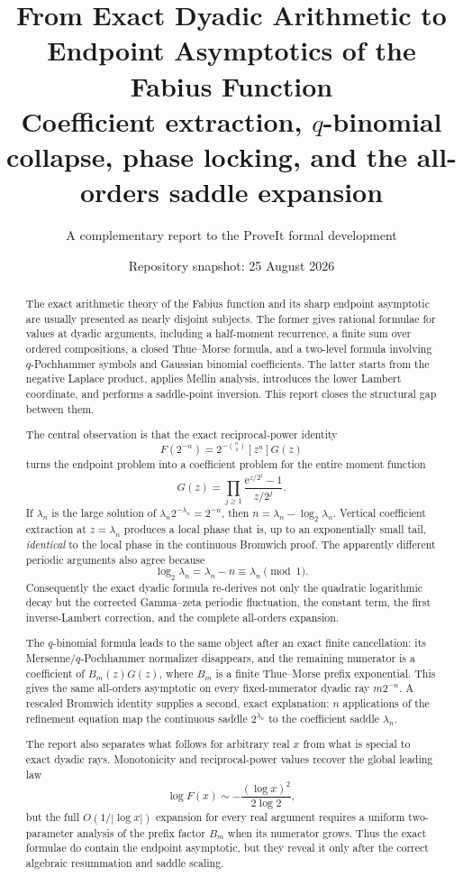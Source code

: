 \documentclass[11pt,oneside]{article}
\title{\bfseries From Exact Dyadic Arithmetic to Endpoint Asymptotics of the Fabius Function\\[0.35em]
\large Coefficient extraction, $q$-binomial collapse, phase locking, and the all-orders saddle expansion}
\author{A complementary report to the ProveIt formal development}
\date{Repository snapshot: 25 August 2026}
\theoremstyle{definition}
\theoremstyle{remark}
\newcommand{\e}{\mathrm e}
\begin{document}
\maketitle

\begin{abstract}
The exact arithmetic theory of the Fabius function and its sharp endpoint asymptotic are usually presented as nearly disjoint subjects.  The former gives rational formulae for values at dyadic arguments, including a half-moment recurrence, a finite sum over ordered compositions, a closed Thue--Morse formula, and a two-level formula involving $q$-Pochhammer symbols and Gaussian binomial coefficients.  The latter starts from the negative Laplace product, applies Mellin analysis, introduces the lower Lambert coordinate, and performs a saddle-point inversion.  This report closes the structural gap between them.

The central observation is that the exact reciprocal-power identity
\[
 F(2^{-n})=2^{-\binom n2}[z^n]G(z)
\]
turns the endpoint problem into a coefficient problem for the entire moment function
\[
 G(z)=\prod_{j\ge1}\frac{\e^{z/2^j}-1}{z/2^j}.
\]
If $\lambda_n$ is the large solution of $\lambda_n2^{-\lambda_n}=2^{-n}$, then
$n=\lambda_n-\log_2\lambda_n$.  Vertical coefficient extraction at $z=\lambda_n$ produces a local phase that is, up to an exponentially small tail, \emph{identical} to the local phase in the continuous Bromwich proof.  The apparently different periodic arguments also agree because
\[
 \log_2\lambda_n=\lambda_n-n\equiv\lambda_n\pmod 1.
\]
Consequently the exact dyadic formula re-derives not only the quadratic logarithmic decay but the corrected Gamma--zeta periodic fluctuation, the constant term, the first inverse-Lambert correction, and the complete all-orders expansion.

The $q$-binomial formula leads to the same object after an exact finite cancellation: its Mersenne/$q$-Pochhammer normalizer disappears, and the remaining numerator is a coefficient of $B_m(z)G(z)$, where $B_m$ is a finite Thue--Morse prefix exponential.  This gives the same all-orders asymptotic on every fixed-numerator dyadic ray $m2^{-n}$.  A rescaled Bromwich identity supplies a second, exact explanation: $n$ applications of the refinement equation map the continuous saddle $2^{\lambda_n}$ to the coefficient saddle $\lambda_n$.

The report also separates what follows for arbitrary real $x$ from what is special to exact dyadic rays.  Monotonicity and reciprocal-power values recover the global leading law
\[
 \log F(x)\sim-\frac{(\log x)^2}{2\log2},
\]
but the full $O(1/|\log x|)$ expansion for every real argument requires a uniform two-parameter analysis of the prefix factor $B_m$ when its numerator grows.  Thus the exact formulae do contain the endpoint asymptotic, but they reveal it only after the correct algebraic resummation and saddle scaling.
\end{abstract}
\end{document}
